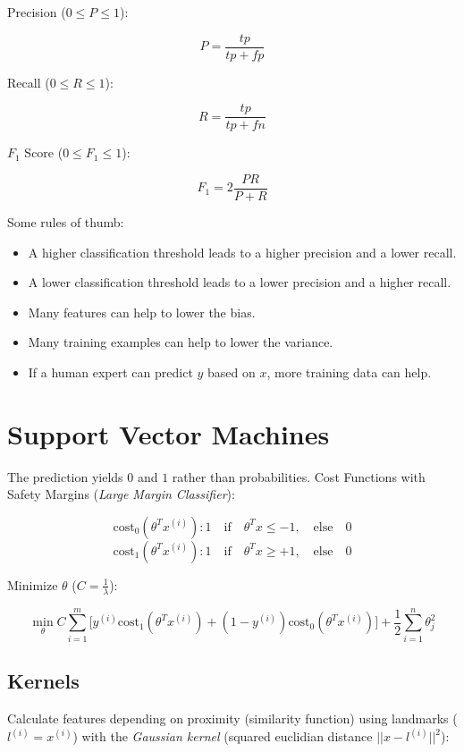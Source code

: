 \documentclass[a4paper,11pt]{scrartcl}
\begin{document}
Precision ($0 \leq P \leq 1$):

$$ P = \frac{tp}{tp+fp} $$

Recall ($0 \leq R \leq 1$):

$$ R = \frac{tp}{tp+fn} $$

$F_{1}$ Score ($0 \leq F_1 \leq 1$):

$$ F_1 = 2 \frac{PR}{P+R} $$

Some rules of thumb:

\begin{itemize}
    \item A higher classification threshold leads to a higher precision and a lower recall.
    \item A lower classification threshold leads to a lower precision and a higher recall.
    \item Many features can help to lower the bias.
    \item Many training examples can help to lower the variance.
    \item If a human expert can predict $y$ based on $x$, more training data can help.
\end{itemize}

\section{Support Vector Machines}

The prediction yields $0$ and $1$ rather than probabilities. Cost Functions with Safety Margins (\textit{Large Margin Classifier}):

$$ \text{cost}_0(\theta^T x^{(i)}): 1 \quad \text{if} \quad \theta^Tx \leq -1, \quad \text{else} \quad 0 $$
$$ \text{cost}_1(\theta^T x^{(i)}): 1 \quad \text{if} \quad \theta^Tx \geq +1, \quad \text{else} \quad 0 $$

Minimize $\theta$ ($C=\frac{1}{\lambda}$):

$$ \displaystyle\min_{\theta} C \sum_{i=1}^m \Bigg[ y^{(i)} \text{cost}_1(\theta^T x^{(i)}) + (1-y^{(i)}) \text{cost}_0(\theta^T x^{(i)}) \Bigg] + \frac{1}{2} \sum_{i=1}^n \theta_j^{2} $$

\subsection{Kernels}

Calculate features depending on proximity (similarity function) using landmarks ($l^{(i)}=x^{(i)}$) with the \textit{Gaussian kernel} (squared euclidian distance $||x-l^{(i)}||^2$):
\end{document}
